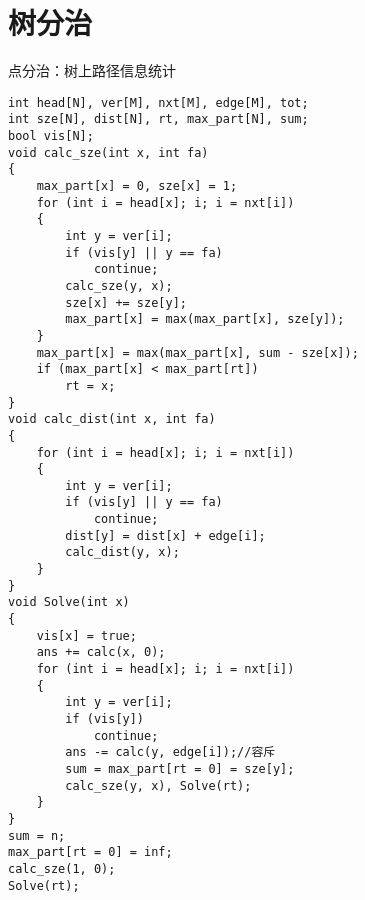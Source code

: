 \section{树分治}
点分治：树上路径信息统计
\begin{lstlisting}
int head[N], ver[M], nxt[M], edge[M], tot;
int sze[N], dist[N], rt, max_part[N], sum;
bool vis[N];
void calc_sze(int x, int fa)
{
    max_part[x] = 0, sze[x] = 1;
    for (int i = head[x]; i; i = nxt[i])
    {
        int y = ver[i];
        if (vis[y] || y == fa)
            continue;
        calc_sze(y, x);
        sze[x] += sze[y];
        max_part[x] = max(max_part[x], sze[y]);
    }
    max_part[x] = max(max_part[x], sum - sze[x]);
    if (max_part[x] < max_part[rt])
        rt = x;
}
void calc_dist(int x, int fa)
{
    for (int i = head[x]; i; i = nxt[i])
    {
        int y = ver[i];
        if (vis[y] || y == fa)
            continue;
        dist[y] = dist[x] + edge[i];
        calc_dist(y, x);
    }
}
void Solve(int x)
{
    vis[x] = true;
    ans += calc(x, 0);
    for (int i = head[x]; i; i = nxt[i])
    {
        int y = ver[i];
        if (vis[y])
            continue;
        ans -= calc(y, edge[i]);//容斥
        sum = max_part[rt = 0] = sze[y];
        calc_sze(y, x), Solve(rt);
    }
}
sum = n;
max_part[rt = 0] = inf;
calc_sze(1, 0);
Solve(rt);
\end{lstlisting}
